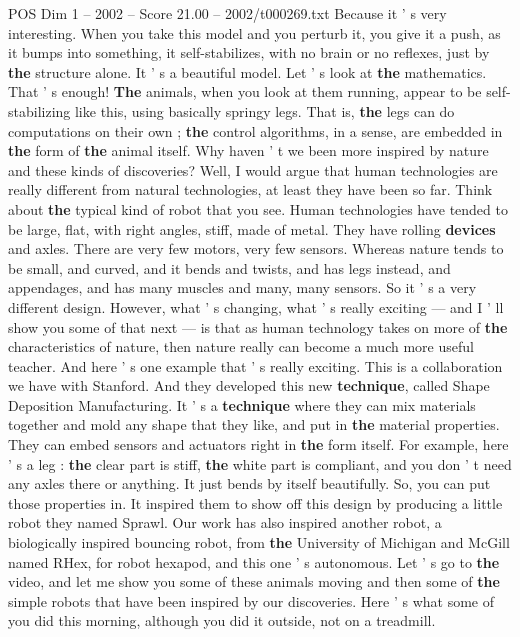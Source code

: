 \begin{textsample}{POS Dim 1 – 2002 – Score 21.00 – 2002/t000269.txt}
Because it ' s very interesting.
When you take this model and you perturb it, you give it a push, as it bumps into something, it self-stabilizes, with no brain or no reflexes, just by \textbf{the} structure alone.
It ' s a beautiful model.
Let ' s look at \textbf{the} mathematics.
That ' s enough! \textbf{The} animals, when you look at them running, appear to be self-stabilizing like this, using basically springy legs.
That is, \textbf{the} legs can do computations on their own ; \textbf{the} control algorithms, in a sense, are embedded in \textbf{the} form of \textbf{the} animal itself.
Why haven ' t we been more inspired by nature and these kinds of discoveries?
Well, I would argue that human technologies are really different from natural technologies, at least they have been so far.
Think about \textbf{the} typical kind of robot that you see.
Human technologies have tended to be large, flat, with right angles, stiff, made of metal.
They have rolling \textbf{devices} and axles.
There are very few motors, very few sensors.
Whereas nature tends to be small, and curved, and it bends and twists, and has legs instead, and appendages, and has many muscles and many, many sensors.
So it ' s a very different design.
However, what ' s changing, what ' s really exciting — and I ' ll show you some of that next — is that as human technology takes on more of \textbf{the} characteristics of nature, then nature really can become a much more useful teacher.
And here ' s one example that ' s really exciting.
This is a collaboration we have with Stanford.
And they developed this new \textbf{technique}, called Shape Deposition Manufacturing.
It ' s a \textbf{technique} where they can mix materials together and mold any shape that they like, and put in \textbf{the} material properties.
They can embed sensors and actuators right in \textbf{the} form itself.
For example, here ' s a leg : \textbf{the} clear part is stiff, \textbf{the} white part is compliant, and you don ' t need any axles there or anything.
It just bends by itself beautifully.
So, you can put those properties in.
It inspired them to show off this design by producing a little robot they named Sprawl.
Our work has also inspired another robot, a biologically inspired bouncing robot, from \textbf{the} University of Michigan and McGill named RHex, for robot hexapod, and this one ' s autonomous.
Let ' s go to \textbf{the} video, and let me show you some of these animals moving and then some of \textbf{the} simple robots that have been inspired by our discoveries.
Here ' s what some of you did this morning, although you did it outside, not on a treadmill.

\end{textsample}
